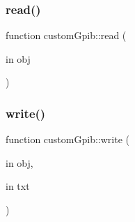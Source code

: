 \mbox{\label{namespacecustom_gpib_ab72cc8876839f04e1ac99b36743c6904}} 
\subsubsection{\texorpdfstring{read()}{read()}}
{\footnotesize\ttfamily function custom\+Gpib\+::read (\begin{DoxyParamCaption}\item[{in}]{obj }\end{DoxyParamCaption})}

\mbox{\label{namespacecustom_gpib_ad3a4ea23e71262a13d8b8b8cdc288993}} 
\subsubsection{\texorpdfstring{write()}{write()}}
{\footnotesize\ttfamily function custom\+Gpib\+::write (\begin{DoxyParamCaption}\item[{in}]{obj,  }\item[{in}]{txt }\end{DoxyParamCaption})}

